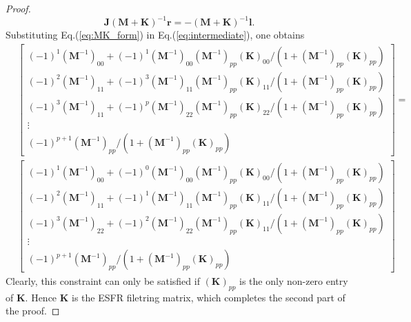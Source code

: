 \documentclass[10pt,a4paper]{amsart}
\begin{document}
\begin{proof}
\begin{equation}
    \mathbf{J}(\mathbf{M} + \mathbf{K})^{-1}\mathbf{r} = -(\mathbf{M} + \mathbf{K})^{-1}\mathbf{l}.
    \label{eq:intermediate}
\end{equation}
Substituting Eq.(\ref{eq:MK_form}) in Eq.(\ref{eq:intermediate}), one obtains
\begin{align}
    &\begin{bmatrix}
        (-1)^1(\mathbf{M}^{-1})_{00} +(-1)^1(\mathbf{M}^{-1})_{00}(\mathbf{M}^{-1})_{pp}(\mathbf{K})_{00}/(1+(\mathbf{M}^{-1})_{pp}(\mathbf{K})_{pp}) \\
        (-1)^2(\mathbf{M}^{-1})_{11} +(-1)^3(\mathbf{M}^{-1})_{11}(\mathbf{M}^{-1})_{pp}(\mathbf{K})_{11}/(1+(\mathbf{M}^{-1})_{pp}(\mathbf{K})_{pp}) \\
        (-1)^3(\mathbf{M}^{-1})_{11} +(-1)^p(\mathbf{M}^{-1})_{22}(\mathbf{M}^{-1})_{pp}(\mathbf{K})_{22}/(1+(\mathbf{M}^{-1})_{pp}(\mathbf{K})_{pp}) \\
        \vdots \\
        (-1)^{p+1}(\mathbf{M}^{-1})_{pp}/(1+(\mathbf{M}^{-1})_{pp} (\mathbf{K})_{pp})
    \end{bmatrix}
    =\nonumber \\
    &\begin{bmatrix}
        (-1)^1(\mathbf{M}^{-1})_{00} + (-1)^0(\mathbf{M}^{-1})_{00}(\mathbf{M}^{-1})_{pp}(\mathbf{K})_{00}/(1+(\mathbf{M}^{-1})_{pp}(\mathbf{K})_{pp}) \\
        (-1)^2(\mathbf{M}^{-1})_{11} +(-1)^1(\mathbf{M}^{-1})_{11}(\mathbf{M}^{-1})_{pp}(\mathbf{K})_{11}/(1+(\mathbf{M}^{-1})_{pp}(\mathbf{K})_{pp}) \\
        (-1)^3(\mathbf{M}^{-1})_{22} +(-1)^2(\mathbf{M}^{-1})_{22}(\mathbf{M}^{-1})_{pp}(\mathbf{K})_{11}/(1+(\mathbf{M}^{-1})_{pp}(\mathbf{K})_{pp}) \\
        \vdots \\
        (-1)^{p+1}(\mathbf{M}^{-1})_{pp}/(1+(\mathbf{M}^{-1})_{pp} (\mathbf{K})_{pp})
    \end{bmatrix}
\end{align}
Clearly, this constraint can only be satisfied if $(\mathbf{K})_{pp}$ is the only non-zero entry of $\mathbf{K}$. Hence $\mathbf{K}$ is the ESFR filetring matrix, which completes the second part of the proof.
\end{proof}
\end{document}

